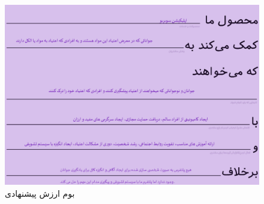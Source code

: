 \documentclass[dvipsnames, svgnames, x11names, 11pt]{article}
\begin{document}
\begin{figure}[b]
\begin{center}
\includegraphics[scale=0.5]{images/canvas3}
\end{center}
\caption{بوم ارزش پیشنهادی}
\label{fig:value-proposed2}
\end{figure}
\end{document}
